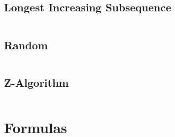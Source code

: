 \documentclass[a4paper, 8pt, landscape, oneside]{extarticle}
\begin{document}
\begin{multicols*}{3}
	    \subsection{Longest Increasing Subsequence}
	    \inputminted{cpp}{src/misc/old_lis.cpp}
	    \subsection{Random}
	    \inputminted{cpp}{src/misc/old_random.cpp}
	    \subsection{Z-Algorithm}
	    \inputminted{cpp}{src/misc/old_zalgo.cpp}       
        \section{Formulas}

      

\end{multicols*}
\end{document}
